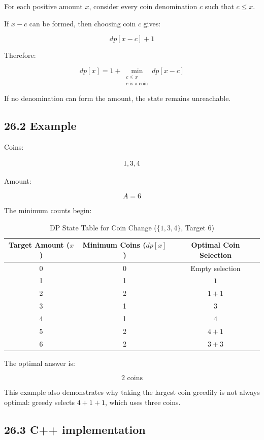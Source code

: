 For each positive amount $x$, consider every coin denomination $c$ such that $c\leq x$.

If $x-c$ can be formed, then choosing coin $c$ gives:


\[
dp[x-c]+1
\]


Therefore:


\[
\boxed{ dp[x]=1+\min_{\substack{c\leq x\\ c\text{ is a coin}}}dp[x-c] }
\]


If no denomination can form the amount, the state remains unreachable.

\subsection{26.2 Example}

Coins:


\[
\\{1,3,4\\}
\]


Amount:


\[
A=6
\]


The minimum counts begin:

\begin{table}[htbp]
\centering
\caption{DP State Table for Coin Change ($\{1, 3, 4\}$, Target 6)}
\label{tab:coin_change_dp}
\begin{tabular}{ccc}
\toprule
\textbf{Target Amount ($x$)} & \textbf{Minimum Coins ($dp[x]$)} & \textbf{Optimal Coin Selection} \\
\midrule
0 & 0 & Empty selection \\
1 & 1 & $1$ \\
2 & 2 & $1 + 1$ \\
3 & 1 & $3$ \\
4 & 1 & $4$ \\
5 & 2 & $4 + 1$ \\
6 & 2 & $3 + 3$ \\
\bottomrule
\end{tabular}
\end{table}

The optimal answer is:


\[
\boxed{2\text{ coins}}
\]


This example also demonstrates why taking the largest coin greedily is not always optimal: greedy selects $4+1+1$, which uses three coins.

\subsection{26.3 C++ implementation}


